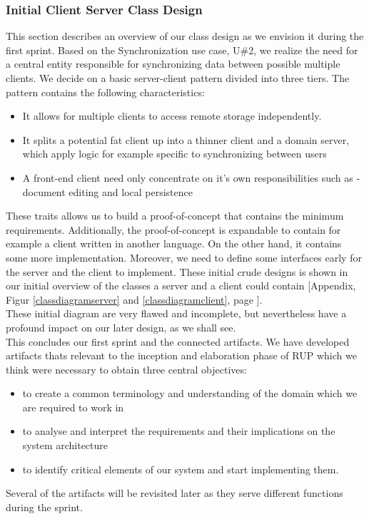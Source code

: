 \subsubsection{Initial Client Server Class Design}
This section describes an overview of our class design as we envision it during the first sprint. Based on the Synchronization use case, U\#2, we realize the need for a central entity responsible for synchronizing data between possible multiple clients. We decide on a basic server-client pattern divided into three tiers. The pattern contains the following characteristics:\\
\begin{itemize}
\item It allows for multiple clients to access remote storage independently.
\item It splits a potential fat client up into a thinner client and a domain server, which apply logic for example specific to synchronizing between users
\item A front-end client need only concentrate on it's own responsibilities such as - document editing and local persistence \cite{ttda}\\
\end{itemize}
These traits allows us to build a proof-of-concept that contains the minimum requirements. Additionally, the proof-of-concept is expandable to contain for example a client written in another language. On the other hand, it contains some more implementation. Moreover, we need to define some interfaces early for the server and the client to implement. These initial crude designs is shown in our initial overview of the classes a server and a client could contain [Appendix, Figur \ref{classdiagramserver} and \ref{classdiagramclient}, page \pageref{classdiagramserver}].\\
These initial diagram are very flawed and incomplete, but nevertheless have a profound impact on our later design, as we shall see.\\
\newline
This concludes our first sprint and the connected artifacts. We have developed artifacts thats relevant to the inception and elaboration phase of RUP which we think were necessary to obtain three central objectives:\\
\begin{itemize}
\item to create a common terminology and understanding of the domain which we are required to work in
\item to analyse and interpret the requirements and their implications on the system architecture
\item to identify critical elements of our system and start implementing them.
\end{itemize}
Several of the artifacts will be revisited later as they serve different functions during the sprint.\\